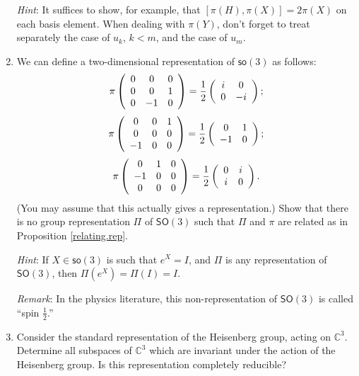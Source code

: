 \documentclass[12pt]{amsbook}
\theoremstyle{plain}
\numberwithin{equation}{chapter}
\numberwithin{theorem}{chapter}
\begin{document}
\begin{enumerate}
\textit{Hint}: It suffices to show, for example, that $\left[  \pi
(H),\pi(X)\right]  =2\pi(X)$ on each basis element. When dealing with $\pi
(Y)$, don't forget to treat separately the case of $u_{k}$, $k<m$, and the
case of $u_{m}$.

\item \label{spin.half}We can define a two-dimensional representation of
$\mathsf{so}(3)$ as follows:
\[
\pi\left(
\begin{array}
[c]{ccc}%
0 & 0 & 0\\
0 & 0 & 1\\
0 & -1 & 0
\end{array}
\right)  =\frac{1}{2}\left(
\begin{array}
[c]{cc}%
i & 0\\
0 & -i
\end{array}
\right)  ;
\]%
\[
\pi\left(
\begin{array}
[c]{ccc}%
0 & 0 & 1\\
0 & 0 & 0\\
-1 & 0 & 0
\end{array}
\right)  =\frac{1}{2}\left(
\begin{array}
[c]{cc}%
0 & 1\\
-1 & 0
\end{array}
\right)  ;
\]%
\[
\pi\left(
\begin{array}
[c]{ccc}%
0 & 1 & 0\\
-1 & 0 & 0\\
0 & 0 & 0
\end{array}
\right)  =\frac{1}{2}\left(
\begin{array}
[c]{cc}%
0 & i\\
i & 0
\end{array}
\right)  \text{.}%
\]
(You may assume that this actually gives a representation.) Show that there is
no group representation $\Pi$ of $\mathsf{SO}(3)$ such that $\Pi$ and $\pi$
are related as in Proposition \ref{relating.rep}.

\textit{Hint}: If $X\in\mathsf{so}(3)$ is such that $e^{X}=I$, and $\Pi$ is
any representation of $\mathsf{SO}(3)$, then $\Pi(e^{X})=\Pi(I)=I$.

\textit{Remark}: In the physics literature, this non-representation of
$\mathsf{SO}(3)$ is called ``spin $\frac{1}{2}$.''

\item \label{heisenberg.inv}Consider the standard representation of the
Heisenberg group, acting on $\mathbb{C}^{3}$. Determine all subspaces of
$\mathbb{C}^{3}$ which are invariant under the action of the Heisenberg group.
Is this representation completely reducible?


\end{enumerate}
\end{document}
